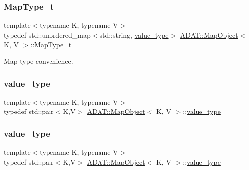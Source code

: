 \subsubsection{\texorpdfstring{MapType\_t}{MapType\_t}\hspace{0.1cm}{\footnotesize\ttfamily [3/3]}}
{\footnotesize\ttfamily template$<$typename K, typename V$>$ \\
typedef std\+::unordered\+\_\+map$<$std\+::string, \mbox{\hyperlink{classADAT_1_1MapObject_ad985e6ff5b35a72c79d4b466d316cc0a}{value\+\_\+type}}$>$ \mbox{\hyperlink{classADAT_1_1MapObject}{A\+D\+A\+T\+::\+Map\+Object}}$<$ K, V $>$\+::\mbox{\hyperlink{classADAT_1_1MapObject_ad6a4952087d3de5a43d08b2ea2ad270b}{Map\+Type\+\_\+t}}}



Map type convenience. 

\mbox{\label{classADAT_1_1MapObject_ad985e6ff5b35a72c79d4b466d316cc0a}} 
\subsubsection{\texorpdfstring{value\_type}{value\_type}\hspace{0.1cm}{\footnotesize\ttfamily [1/3]}}
{\footnotesize\ttfamily template$<$typename K, typename V$>$ \\
typedef std\+::pair$<$K,V$>$ \mbox{\hyperlink{classADAT_1_1MapObject}{A\+D\+A\+T\+::\+Map\+Object}}$<$ K, V $>$\+::\mbox{\hyperlink{classADAT_1_1MapObject_ad985e6ff5b35a72c79d4b466d316cc0a}{value\+\_\+type}}}

\mbox{\label{classADAT_1_1MapObject_ad985e6ff5b35a72c79d4b466d316cc0a}} 
\subsubsection{\texorpdfstring{value\_type}{value\_type}\hspace{0.1cm}{\footnotesize\ttfamily [2/3]}}
{\footnotesize\ttfamily template$<$typename K, typename V$>$ \\
typedef std\+::pair$<$K,V$>$ \mbox{\hyperlink{classADAT_1_1MapObject}{A\+D\+A\+T\+::\+Map\+Object}}$<$ K, V $>$\+::\mbox{\hyperlink{classADAT_1_1MapObject_ad985e6ff5b35a72c79d4b466d316cc0a}{value\+\_\+type}}}


